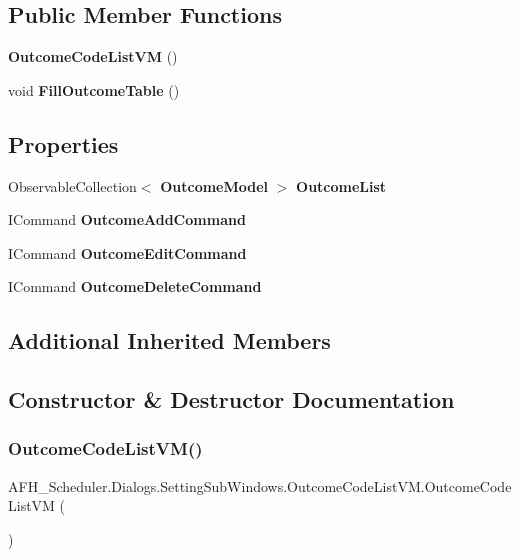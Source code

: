 \subsection*{Public Member Functions}
\begin{DoxyCompactItemize}
\item 
\textbf{ Outcome\+Code\+List\+VM} ()
\item 
void \textbf{ Fill\+Outcome\+Table} ()
\end{DoxyCompactItemize}
\subsection*{Properties}
\begin{DoxyCompactItemize}
\item 
Observable\+Collection$<$ \textbf{ Outcome\+Model} $>$ \textbf{ Outcome\+List}\hspace{0.3cm}{\ttfamily  [get, set]}
\item 
I\+Command \textbf{ Outcome\+Add\+Command}\hspace{0.3cm}{\ttfamily  [get]}
\item 
I\+Command \textbf{ Outcome\+Edit\+Command}\hspace{0.3cm}{\ttfamily  [get]}
\item 
I\+Command \textbf{ Outcome\+Delete\+Command}\hspace{0.3cm}{\ttfamily  [get]}
\end{DoxyCompactItemize}
\subsection*{Additional Inherited Members}


\subsection{Constructor \& Destructor Documentation}
\mbox{\label{class_a_f_h___scheduler_1_1_dialogs_1_1_setting_sub_windows_1_1_outcome_code_list_v_m_a82c189b0b4a0e7a3337d32a16c61350c}} 
\subsubsection{OutcomeCodeListVM()}
{\footnotesize\ttfamily A\+F\+H\+\_\+\+Scheduler.\+Dialogs.\+Setting\+Sub\+Windows.\+Outcome\+Code\+List\+V\+M.\+Outcome\+Code\+List\+VM (\begin{DoxyParamCaption}{ }\end{DoxyParamCaption})}



